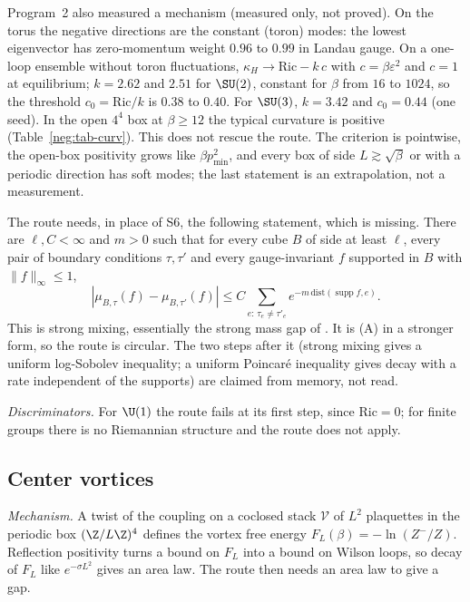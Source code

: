 Program~2 also measured a mechanism (measured only, not proved). On the torus the negative directions are
the constant (toron) modes: the lowest eigenvector has zero-momentum weight $0.96$ to $0.99$ in
Landau gauge. On a one-loop ensemble without toron fluctuations, $\kappa_H\to\mathrm{Ric}-k\,c$
with $c=\beta\varepsilon^2$ and $c=1$ at equilibrium; $k=2.62$ and $2.51$ for $\SU(2)$,
constant for $\beta$ from $16$ to $1024$, so the threshold $c_0=\mathrm{Ric}/k$ is $0.38$ to
$0.40$. For $\SU(3)$, $k=3.42$ and $c_0=0.44$ (one seed). In the open $4^4$ box at $\beta\ge12$
the typical curvature is positive (Table~\ref{neg:tab-curv}). This does not rescue the route.
The criterion is pointwise, the open-box positivity grows like $\beta p_{\min}^2$, and every box
of side $L\gtrsim\sqrt\beta$ or with a periodic direction has soft modes; the last statement is
an extrapolation, not a measurement.

\begin{observation}\label{neg:obs-curv-missing}
The route needs, in place of S6, the following statement, which is missing. There are
$\ell,C<\infty$ and $m>0$ such that for every cube $B$ of side at least $\ell$, every pair of
boundary conditions $\tau,\tau'$ and every gauge-invariant $f$ supported in $B$ with
$\|f\|_\infty\le1$,
\[
|\mu_{B,\tau}(f)-\mu_{B,\tau'}(f)|\le C\sum_{e:\,\tau_e\ne\tau'_e}e^{-m\,\mathrm{dist}(\operatorname{supp}f,e)}.
\]
This is strong mixing, essentially the strong mass gap of \cite[Def.~2.3]{Ch21}. It is (A)
in a stronger form, so the route is circular. The two steps after it (strong mixing gives a
uniform log-Sobolev inequality; a uniform Poincar\'e inequality gives decay with a rate
independent of the supports) are claimed from memory, not read.
\end{observation}

\emph{Discriminators.} For $\U(1)$ the route fails at its first step, since $\mathrm{Ric}=0$;
for finite groups there is no Riemannian structure and the route does not apply.

\subsection{Center vortices}\label{neg:sub-vort}

\emph{Mechanism.} A twist of the coupling on a coclosed stack $\mathcal V$ of $L^2$ plaquettes
in the periodic box $(\Z/L\Z)^4$ defines the vortex free energy $F_L(\beta)=-\ln(Z^-/Z)$.
Reflection positivity turns a bound on $F_L$ into a bound on Wilson loops, so decay of $F_L$
like $e^{-\sigma L^2}$ gives an area law. The route then needs an area law to give a gap.

